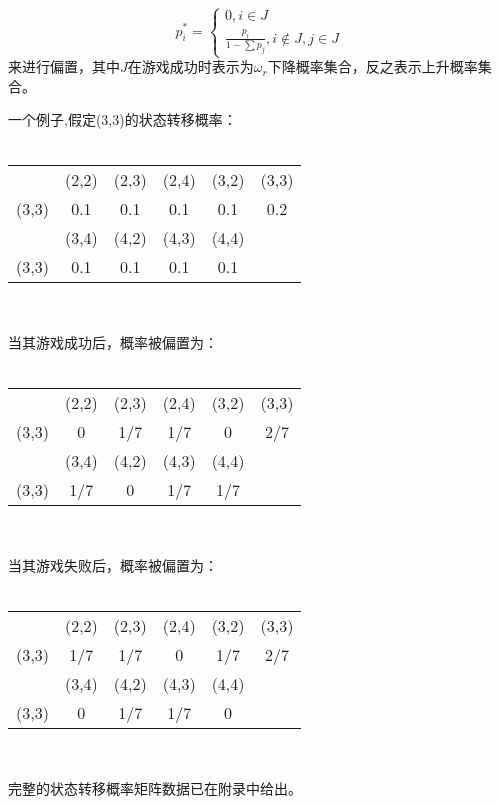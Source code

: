 \documentclass[hyperref]{ctexart}
\begin{document}
\begin{multicols}{2}
    \noindent
    \begin{equation}
        p_i^* = \begin{cases} 0, i \in J \\ \frac{p_i}{1 - \sum p_j}, i \notin J ,j \in J\end{cases}
    \end{equation}
    来进行偏置，其中$J$在游戏成功时表示为$\omega_r$下降概率集合，反之表示上升概率集合。
    \par\indent\par
    一个例子,假定(3,3)的状态转移概率：\\
    \\
    \begin{tabular}{c|ccccc}
      & (2,2) & (2,3)  & (2,4) & (3,2) & (3,3)\\
	(3,3) & 0.1 & 0.1& 0.1& 0.1& 0.2\\
	\hline & (3,4) & (4,2) & (4,3) & (4,4) \\
	(3,3) & 0.1& 0.1& 0.1& 0.1
    \end{tabular}\\
    \par
    当其游戏成功后，概率被偏置为：\\ \\
    \begin{tabular}{c|ccccc}
      & (2,2) & (2,3)  & (2,4) & (3,2) & (3,3)\\
	(3,3) & 0 & 1/7 & 1/7 & 0& 2/7\\
	\hline & (3,4) & (4,2) & (4,3) & (4,4) \\
	(3,3) & 1/7& 0& 1/7& 1/7
    \end{tabular}\\
    \par
    当其游戏失败后，概率被偏置为：\\ \\
    \begin{tabular}{c|ccccc}
      & (2,2) & (2,3)  & (2,4) & (3,2) & (3,3)\\
	(3,3) & 1/7 & 1/7 & 0 & 1/7& 2/7\\
	\hline & (3,4) & (4,2) & (4,3) & (4,4) \\
	(3,3) & 0& 1/7 & 1/7& 0
    \end{tabular}\\
    \par
    完整的状态转移概率矩阵数据已在附录中给出。

\end{multicols}
\end{document}
